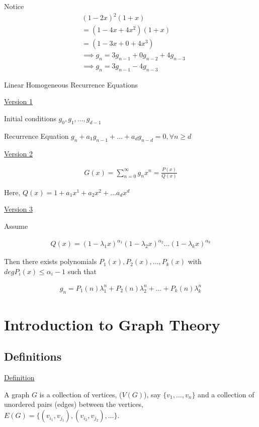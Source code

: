 \documentclass{article}
\begin{document}
Notice
\begin{align*}
    &(1-2x)^2(1+x) \\
    &= (1-4x+4x^2)(1+x) \\
    &= (1-3x + 0 + 4x^3) \\
    &\implies g_n = 3g_{n-1} + 0 g_{n-2} + 4g_{n-3} \\
    &\implies g_n = 3g_{n-1} - 4g_{n-3}
\end{align*}

Linear Homogeneous Recurrence Equations

\underline{Version 1}

Initial conditions $g_0, g_1, \ldots, g_{d-1}$

Recurrence Equation $g_n + a_1g_{n-1}+\ldots+a_dg_{n-d}=0, \forall n \ge d$

\underline{Version 2}

\begin{align*}
    G(x) = \sum_{n=0}^{\infty}g_nx^n = \frac{P(x)}{Q(x)}
\end{align*}

Here, $Q(x) = 1 + a_1x^1 + a_2x^2 + \ldots a_dx^d$


\underline{Version 3}

Assume 

\begin{align*}
    Q(x) = (1-\lambda_1x)^{\alpha_1}(1-\lambda_2x)^{\alpha_2}\ldots(1-\lambda_kx)^{\alpha_k}
\end{align*}

Then there exists polynomials $P_1(x), P_2(x), \ldots, P_k(x)$ with $deg P_i(x) \le \alpha_i - 1$ such that 

\begin{align*}
    g_n = P_1(n)\lambda_1^n + P_2(n)\lambda_2^n + \ldots + P_k(n)\lambda_k^n
\end{align*}




\section{Introduction to Graph Theory}

\subsection{Definitions}

\underline{Definition}

A graph $G$ is a collection of vertices, ($V(G)$), say $\{v_1,\ldots,v_n\}$ and a collection of unordered pairs (edges) between the vertices, $E(G) = \{(v_{i_1},v_{j_1}),(v_{i_2}, v_{j_2}),\ldots \}$.
\end{document}
